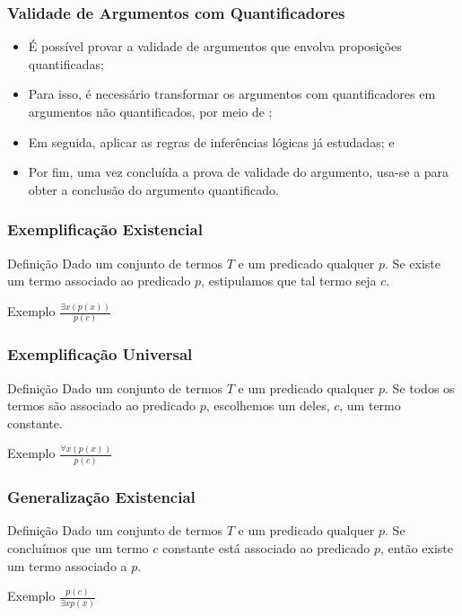 \documentclass[aspectratio=169]{beamer} %
\begin{document}
\begin{frame}
\frametitle{Validade de Argumentos com Quantificadores}

\begin{itemize}
	\item É possível provar a validade de argumentos que envolva proposições quantificadas;
	\item Para isso, é necessário transformar os argumentos com quantificadores em argumentos não quantificados, por meio de ;
	\item Em seguida, aplicar as regras de inferências lógicas já estudadas; e
	\item Por fim, uma vez concluída a prova de validade do argumento, usa-se a  para obter a conclusão do argumento quantificado.
\end{itemize}
\end{frame}

\begin{frame}
\frametitle{Exemplificação Existencial}

\begin{block}{Definição}
Dado um conjunto de termos $T$ e um predicado qualquer $p$. Se existe um termo associado ao predicado $p$, estipulamos que tal termo seja $c$.
\end{block}\vfill

\begin{exampleblock}{Exemplo}
	\Large
	$\frac{\exists x (p(x))}{p(c)}$
\end{exampleblock}
\end{frame}

\begin{frame}
\frametitle{Exemplificação Universal}

\begin{block}{Definição}
Dado um conjunto de termos $T$ e um predicado qualquer $p$. Se todos os termos são associado ao predicado $p$, escolhemos um deles, $c$, um termo
constante.
\end{block}\vfill

\begin{exampleblock}{Exemplo}
	\Large
	$\frac{\forall x (p(x))}{p(c)}$
\end{exampleblock}
\end{frame}

\begin{frame}
\frametitle{Generalização Existencial}

\begin{block}{Definição}
Dado um conjunto de termos $T$ e um predicado qualquer $p$. Se concluímos que um termo $c$ constante está associado ao predicado $p$, então existe um
termo associado a $p$.
\end{block}\vfill

\begin{exampleblock}{Exemplo}
	\Large
	$\frac{p(c)}{ \exists x p(x)}$
\end{exampleblock}
\end{frame}
\end{document}
